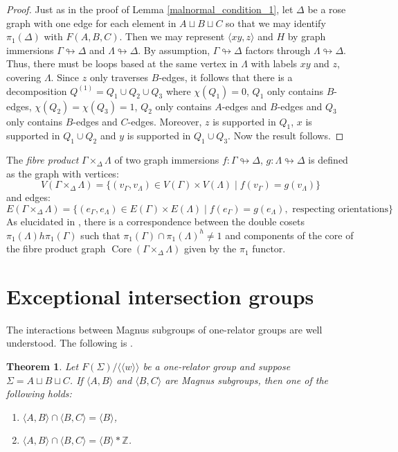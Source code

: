 \documentclass[11pt, a4paper]{amsart}
\newtheorem{theorem}{Theorem}[section]
\theoremstyle{definition}
\newcommand{\Z}{\mathbb{Z}}
\newcommand{\normal}[1]{\langle\langle #1 \rangle\rangle}
\def\immerses{\looparrowright}
\DeclareMathOperator{\core}{Core}
\begin{document}
\begin{proof}
Just as in the proof of Lemma \ref{malnormal_condition_1}, let $\Delta$ be a rose graph with one edge for each element in $A\sqcup B\sqcup C$ so that we may identify $\pi_1(\Delta)$ with $F(A, B, C)$. Then we may represent $\langle xy, z\rangle$ and $H$ by graph immersions $\Gamma\immerses\Delta$ and $\Lambda\immerses\Delta$. By assumption, $\Gamma\immerses\Delta$ factors through $\Lambda\immerses\Delta$. Thus, there must be loops based at the same vertex in $\Lambda$ with labels $xy$ and $z$, covering $\Lambda$. Since $z$ only traverses $B$-edges, it follows that there is a decomposition $Q^{(1)} = Q_1\cup Q_2\cup Q_3$ where $\chi(Q_1) = 0$, $Q_1$ only contains $B$-edges, $\chi(Q_2) = \chi(Q_3) = 1$, $Q_2$ only contains $A$-edges and $B$-edges and $Q_3$ only contains $B$-edges and $C$-edges. Moreover, $z$ is supported in $Q_1$, $x$ is supported in $Q_1\cup Q_2$ and $y$ is supported in $Q_1\cup Q_3$. Now the result follows.
\end{proof}

The \emph{fibre product} $\Gamma\times_{\Delta}\Lambda$ of two graph immersions $f:\Gamma\immerses \Delta$, $g:\Lambda\immerses \Delta$ is defined as the graph with vertices:
\[
V(\Gamma\times_{\Delta}\Lambda) = \{(v_{\Gamma}, v_{\Lambda})\in V(\Gamma)\times V(\Lambda) \mid f(v_{\Gamma}) = g(v_{\Lambda})\}
\]
and edges:
\[
E(\Gamma\times_{\Delta}\Lambda) = \{(e_{\Gamma}, e_{\Lambda})\in E(\Gamma)\times E(\Lambda) \mid f(e_{\Gamma}) = g(e_{\Lambda}), \text{ respecting orientations}\}
\]
As elucidated in \cite{sta_83}, there is a correspondence between the double cosets $\pi_1(\Lambda)h\pi_1(\Gamma)$ such that $\pi_1(\Gamma)\cap \pi_1(\Lambda)^h \neq 1$ and components of the core of the fibre product graph $\core(\Gamma\times_{\Delta}\Lambda)$ given by the $\pi_1$ functor.



\section{Exceptional intersection groups}

The interactions between Magnus subgroups of one-relator groups are well understood. The following is \cite[Theorem 2]{collins_04}.

\begin{theorem}
\label{exceptional_intersection}
Let $F(\Sigma)/\normal{w}$ be a one-relator group and suppose $\Sigma = A\sqcup B\sqcup C$. If $\langle A, B\rangle$ and $\langle B, C\rangle$ are Magnus subgroups, then one of the following holds:
\begin{enumerate}
\item $\langle A, B\rangle\cap \langle B, C\rangle = \langle B\rangle$,
\item $\langle A, B\rangle\cap \langle B, C\rangle = \langle B\rangle*\Z$.
\end{enumerate}
\end{theorem}
\end{document}
